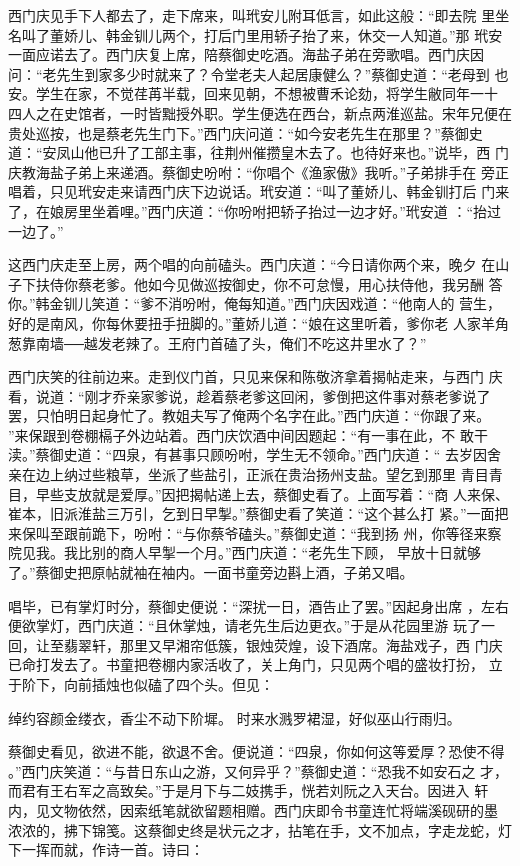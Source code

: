 西门庆见手下人都去了，走下席来，叫玳安儿附耳低言，如此这般：“即去院
里坐名叫了董娇儿、韩金钏儿两个，打后门里用轿子抬了来，休交一人知道。”那
玳安一面应诺去了。西门庆复上席，陪蔡御史吃酒。海盐子弟在旁歌唱。西门庆因
问：“老先生到家多少时就来了？令堂老夫人起居康健么？”蔡御史道：“老母到
也安。学生在家，不觉荏苒半载，回来见朝，不想被曹禾论劾，将学生敝同年一十
四人之在史馆者，一时皆黜授外职。学生便选在西台，新点两淮巡盐。宋年兄便在
贵处巡按，也是蔡老先生门下。”西门庆问道：“如今安老先生在那里？”蔡御史
道：“安凤山他已升了工部主事，往荆州催攒皇木去了。也待好来也。”说毕，西
门庆教海盐子弟上来递酒。蔡御史吩咐：“你唱个《渔家傲》我听。”子弟排手在
旁正唱着，只见玳安走来请西门庆下边说话。玳安道：“叫了董娇儿、韩金钏打后
门来了，在娘房里坐着哩。”西门庆道：“你吩咐把轿子抬过一边才好。”玳安道
：“抬过一边了。”

这西门庆走至上房，两个唱的向前磕头。西门庆道：“今日请你两个来，晚夕
在山子下扶侍你蔡老爹。他如今见做巡按御史，你不可怠慢，用心扶侍他，我另酬
答你。”韩金钏儿笑道：“爹不消吩咐，俺每知道。”西门庆因戏道：“他南人的
营生，好的是南风，你每休要扭手扭脚的。”董娇儿道：“娘在这里听着，爹你老
人家羊角葱靠南墙──越发老辣了。王府门首磕了头，俺们不吃这井里水了？”

西门庆笑的往前边来。走到仪门首，只见来保和陈敬济拿着揭帖走来，与西门
庆看，说道：“刚才乔亲家爹说，趁着蔡老爹这回闲，爹倒把这件事对蔡老爹说了
罢，只怕明日起身忙了。教姐夫写了俺两个名字在此。”西门庆道：“你跟了来。
”来保跟到卷棚槅子外边站着。西门庆饮酒中间因题起：“有一事在此，不
敢干渎。”蔡御史道：“四泉，有甚事只顾吩咐，学生无不领命。”西门庆道：“
去岁因舍亲在边上纳过些粮草，坐派了些盐引，正派在贵治扬州支盐。望乞到那里
青目青目，早些支放就是爱厚。”因把揭帖递上去，蔡御史看了。上面写着：“商
人来保、崔本，旧派淮盐三万引，乞到日早掣。”蔡御史看了笑道：“这个甚么打
紧。”一面把来保叫至跟前跪下，吩咐：“与你蔡爷磕头。”蔡御史道：“我到扬
州，你等径来察院见我。我比别的商人早掣一个月。”西门庆道：“老先生下顾，
早放十日就够了。”蔡御史把原帖就袖在袖内。一面书童旁边斟上酒，子弟又唱。

唱毕，已有掌灯时分，蔡御史便说：“深扰一日，酒告止了罢。”因起身出席
，左右便欲掌灯，西门庆道：“且休掌烛，请老先生后边更衣。”于是从花园里游
玩了一回，让至翡翠轩，那里又早湘帘低簇，银烛荧煌，设下酒席。海盐戏子，西
门庆已命打发去了。书童把卷棚内家活收了，关上角门，只见两个唱的盛妆打扮，
立于阶下，向前插烛也似磕了四个头。但见：

绰约容颜金缕衣，香尘不动下阶墀。
时来水溅罗裙湿，好似巫山行雨归。

蔡御史看见，欲进不能，欲退不舍。便说道：“四泉，你如何这等爱厚？恐使不得
。”西门庆笑道：“与昔日东山之游，又何异乎？”蔡御史道：“恐我不如安石之
才，而君有王右军之高致矣。”于是月下与二妓携手，恍若刘阮之入天台。因进入
轩内，见文物依然，因索纸笔就欲留题相赠。西门庆即令书童连忙将端溪砚研的墨
浓浓的，拂下锦笺。这蔡御史终是状元之才，拈笔在手，文不加点，字走龙蛇，灯
下一挥而就，作诗一首。诗曰：

